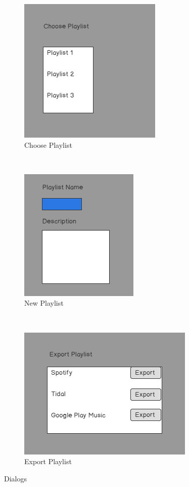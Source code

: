 \documentclass[12pt]{article}
\begin{document}
	\begin{figure}[t!]
		\centering
		\begin{subfigure}[t]{0.3\textwidth}
			\centering
			\includegraphics[scale=0.4]{ChoosePlaylistDialog}
			\caption{Choose Playlist}
		\end{subfigure}%
		~ 
		\begin{subfigure}[t]{0.3\textwidth}
			\centering
			\includegraphics[scale=0.4]{NewPlaylistDialog.png}
			\caption{New Playlist}
		\end{subfigure}
		~
		\begin{subfigure}[t]{0.3\textwidth}
			\centering
			\includegraphics[scale=0.4]{ExportPlaylist.png}
			\caption{Export Playlist}
		\end{subfigure}
		\caption{Dialogs}
	\end{figure}
\end{document}
